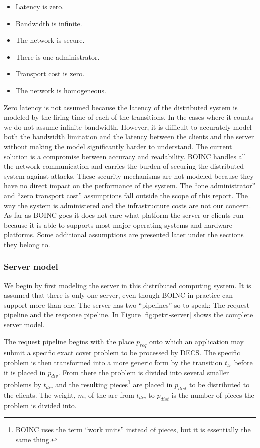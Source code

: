 \begin{itemize}
	\item Latency is zero.
	\item Bandwidth is infinite.
	\item The network is secure.
	\item There is one administrator.
	\item Transport cost is zero.
	\item The network is homogeneous.
\end{itemize}
Zero latency is not assumed because the latency of the distributed system is modeled by the firing time of each of the transitions.
In the cases where it counts we do not assume infinite bandwidth.
However, it is difficult to accurately model both the bandwidth limitation and the latency between the clients and the server without making the model significantly harder to understand.
The current solution is a compromise between accuracy and readability.
BOINC handles all the network communication and carries the burden of securing the distributed system against attacks.
These security mechanisms are not modeled because they have no direct impact on the performance of the system.
The ``one administrator'' and ``zero transport cost'' assumptions fall outside the scope of this report.
The way the system is administered and the infrastructure costs are not our concern.
As far as BOINC goes it does not care what platform the server or clients run because it is able to supports most major operating systems and hardware platforms.
Some additional assumptions are presented later under the sections they belong to.


\subsubsection{Server model}

We begin by first modeling the server in this distributed computing system.
It is assumed that there is only one server, even though BOINC in practice can support more than one.
The server has two ``pipelines'' so to speak: The request pipeline and the response pipeline.
In Figure \ref{fig:petri-server} shows the complete server model.

The request pipeline begins with the place $p_{req}$ onto which an application may submit a specific exact cover problem to be processed by DECS.
The specific problem is then transformed into a more generic form by the transition $t_{tr}$ before it is placed in $p_{div}$.
From there the problem is divided into several smaller problems by $t_{div}$ and the resulting pieces\footnote{BOINC uses the term ``work units'' instead of pieces, but it is essentially the same thing.} are placed in $p_{dist}$ to be distributed to the clients.
The weight, $m$, of the arc from $t_{div}$ to $p_{dist}$ is the number of pieces the problem is divided into.

